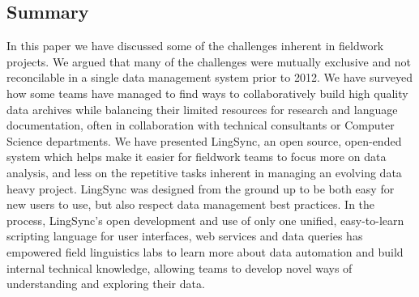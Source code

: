 \documentclass[letterpaper, 12pt, dvips]{mitwpl}
\begin{document}
\subsection{Summary}
\label{sec:summary} 

In this paper we have discussed some of the challenges inherent in fieldwork projects. 
We argued that many of the challenges were mutually exclusive and not reconcilable in a single data management system prior to 2012. 
We have surveyed how some teams have managed to find ways to collaboratively build high quality data archives while balancing  their limited resources for research and language documentation, often in collaboration with technical consultants or Computer Science departments. 
We have presented LingSync, an open source, open-ended system which helps make it easier for fieldwork teams to focus more on data analysis,  and less on the 
 repetitive tasks inherent in managing an evolving data heavy project. 
LingSync was designed from the ground up to be both easy for new users to use, but also respect data management best practices. In the process, LingSync's open development and use of only one unified, easy-to-learn scripting language for user interfaces, web services and data queries has empowered field linguistics labs to learn more about data automation and build internal technical knowledge, allowing teams to develop novel ways of understanding and exploring their data. %




\custombib{}
\end{document}
